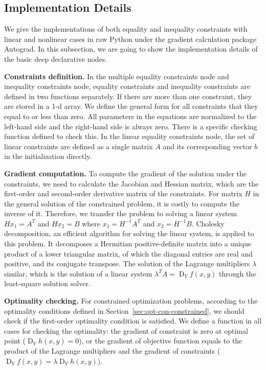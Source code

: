 \subsection{Implementation Details}
We give the implementations of both equality and inequality constraints with linear and nonlinear cases in raw Python under the gradient calculation package Autograd\citep{MD:15}. In this subsection, we are going to show the implementation details of the basic deep declarative nodes.
\par \textbf{Constraints definition.}  
In the multiple equality constraints node and inequality constraints node, equality constraints and inequality constraints are defined in two functions separately. If there are more than one constraint, they are stored in a 1-d array. We define the general form for all constraints that they equal to or less than zero. All parameters in the equations are normalized to the left-hand side and the right-hand side is always zero. There is a specific checking function defined to check this. In the linear equality constraints node, the set of linear constraints are defined as a single matrix $A$ and its corresponding vector $b$ in the initialization directly. 

\par \textbf{Gradient computation.}
To compute the gradient of the solution under the constraints, we need to calculate the Jacobian and Hessian matrix, which are the first-order and second-order derivative matrix of the constraints. For matrix $H$ in the general solution of the constrained problem, it is costly to compute the inverse of it. Therefore, we transfer the problem to solving a linear system $Hx_1 = A^T$ and $Hx_2 = B$ where $x_1 = H^{-1}A^T$ and $x_2 = H^{-1}B$. Cholesky decomposition, an efficient algorithm for solving the linear system, is applied to this problem. It decomposes a Hermitian positive-definite matrix into a unique product of a lower triangular matrix, of which the diagonal entries are real and positive, and its conjugate transpose. The solution of the Lagrange multipliers $\lambda$ similar, which is the solution of a linear system $\lambda^T A = \operatorname{D}_Yf(x,y)$ through the least-square solution solver. 
\par \textbf{Optimality checking.} For constrained optimization problems, according to the optimality conditions defined in Section~\ref{sec:opt-con-constrained}, we should check if the first-order optimality condition is satisfied. We define a function in all cases for checking the optimality: the gradient of constraint is zero at optimal point ($\operatorname{D}_Yh(x,y) = 0$), or the gradient of objective function equals to the product of the Lagrange multipliers and the gradient of constraints ($\operatorname{D}_Yf(x, y) = \lambda \operatorname{D}_Yh(x, y)$). 


